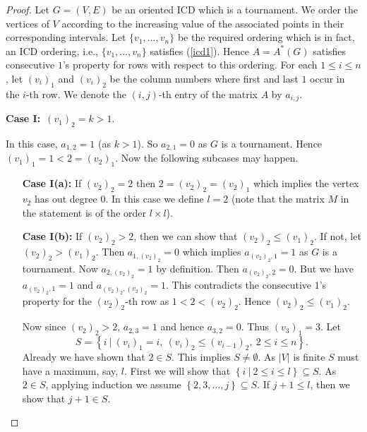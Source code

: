 \documentclass{article}
\theoremstyle{definition}
\numberwithin{equation}{section}
\newcommand{\set}[1]{\left\{#1\right\}}
\newcommand{\Set}[2]{\set{#1\ \vert\ #2}}
\begin{document}
\begin{proof}
Let $G=(V,E)$ be an oriented ICD which is a tournament. We order the vertices of $V$ according to the increasing value of the associated points in their corresponding intervals. Let $\{v_{1},\hdots,v_{n}\}$ be the required ordering which is in fact, an ICD ordering, i.e., $\{v_{1},\hdots,v_{n}\}$ satisfies (\ref{icd1}). Hence $A=A^{*}(G)$ satisfies consecutive $1$'s property for rows with respect to this ordering. For each $1\leq i \leq n$, let ${(v_{i})}_{1}$ and ${(v_{i})}_{2}$ be the column numbers where first and last $1$ occur in the $i$-th row. We denote the $(i,j)$-th entry of the matrix $A$ by $a_{i,j}$.  

\vspace{0.25em}\noindent 
{\bf Case I:}\ ${(v_{1})}_{2}=k>1$.

\vspace{0.25em}\noindent 
In this case, $a_{1,2}=1$ (as $k>1$). So $a_{2,1}=0$ as $G$ is a tournament. Hence ${(v_{1})}_{1}=1<2={(v_{2})}_{1}$. Now the following subcases may happen.

\begin{itemize}
\item[{\bf Case I(a):}] If ${(v_{2})}_{2}=2$ then $2={(v_{2})}_{2}={(v_{2})}_{1}$ which implies the vertex $v_{2}$ has out degree $0$. In this case we define $l=2$ (note that the matrix $M$ in the statement is of the order $l\times l$).

\item[{\bf Case I(b):}] If ${(v_{2})}_{2}>2$, then we can show that ${(v_{2})}_{2}\leq {(v_{1})}_{2}$. If not, let ${(v_{2})}_{2}>{(v_{1})}_{2}$. Then $a_{1,(v_{2})_{2}}=0$ which implies $a_{{(v_{2})}_{2},1}=1$ as $G$ is a tournament. Now $a_{2,(v_2)_2}=1$ by definition. Then $a_{(v_{2})_{2},2}=0$. But we have $a_{{(v_{2})}_{2},1}=1$ and $a_{{(v_{2})}_{2}, {(v_{2})}_{2}}=1$. This contradicts the consecutive $1$'s property for the ${(v_{2})}_{2}$-th row as $1<2<(v_2)_2$. Hence ${(v_{2})}_{2}\leq {(v_{1})}_{2}$. 

\vspace{0.25em}\noindent
Now since ${(v_{2})}_{2}>2$, $a_{2,3}=1$ and hence $a_{3,2}=0$. Thus ${(v_{3})}_{1}=3$. Let 
$$S=\Set{i}{{(v_{i})}_{1}=i,\ {(v_{i})}_{2}\leq {(v_{i-1})}_{2},\ 2\leq i\leq n}.$$ 
Already we have shown that $2\in S$. This implies $S\neq \emptyset$. As $|V|$ is finite $S$ must have a maximum, say, $l$. First we will show that $\Set{i}{2\leq i\leq l}\subseteq S$. As $2\in S$, applying induction we assume $\set{2,3,\ldots,j}\subseteq S$. If $j+1\leq l$, then we  show that $j+1\in S$. 


\end{itemize}
\end{proof}
\end{document}
